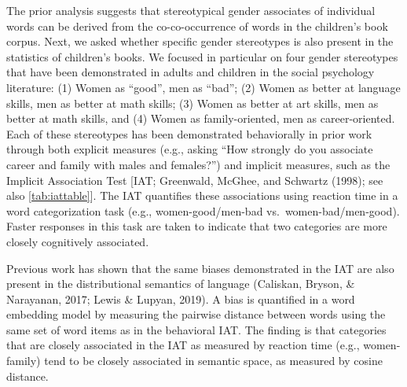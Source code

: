 \documentclass[english,,man,floatsintext]{apa6}
\begin{document}
The prior analysis suggests that stereotypical gender associates of individual words can be derived from the co-co-occurrence of words in the children's book corpus. Next, we asked whether specific gender stereotypes is also present in the statistics of children's books. We focused in particular on four gender stereotypes that have been demonstrated in adults and children in the social psychology literature: (1) Women as \enquote{good}, men as \enquote{bad}; (2) Women as better at language skills, men as better at math skills; (3) Women as better at art skills, men as better at math skills, and (4) Women as family-oriented, men as career-oriented. Each of these stereotypes has been demonstrated behaviorally in prior work through both explicit measures (e.g., asking \enquote{How strongly do you associate career and family with males and females?}) and implicit measures, such as the Implicit Association Test {[}IAT; Greenwald, McGhee, and Schwartz (1998); see also \autoref{tab:iattable}{]}. The IAT quantifies these associations using reaction time in a word categorization task (e.g., women-good/men-bad vs.~women-bad/men-good). Faster responses in this task are taken to indicate that two categories are more closely cognitively associated.

Previous work has shown that the same biases demonstrated in the IAT are also present in the distributional semantics of language (Caliskan, Bryson, \& Narayanan, 2017; Lewis \& Lupyan, 2019). A bias is quantified in a word embedding model by measuring the pairwise distance between words using the same set of word items as in the behavioral IAT. The finding is that categories that are closely associated in the IAT as measured by reaction time (e.g., women-family) tend to be closely associated in semantic space, as measured by cosine distance.

\begingroup\fontsize{9}{11}\selectfont
\end{document}
